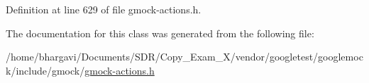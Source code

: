 Definition at line 629 of file gmock-\/actions.\+h.



The documentation for this class was generated from the following file\+:\begin{DoxyCompactItemize}
\item 
/home/bhargavi/\+Documents/\+S\+D\+R/\+Copy\+\_\+\+Exam\+\_\+X/vendor/googletest/googlemock/include/gmock/\hyperlink{gmock-actions_8h}{gmock-\/actions.\+h}\end{DoxyCompactItemize}
